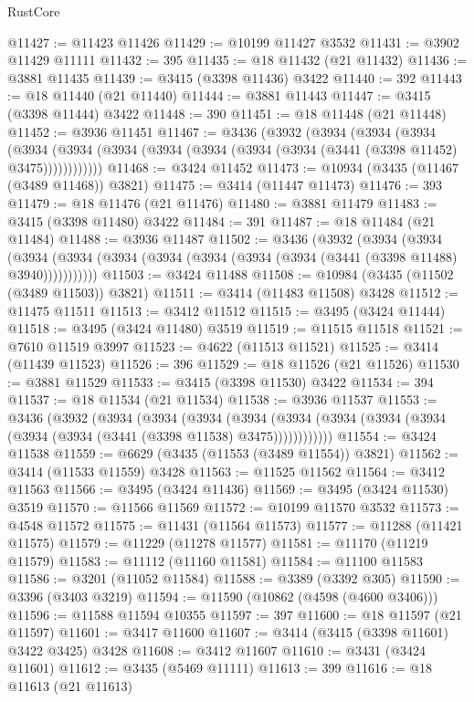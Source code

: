 \begin{lexlean}{RustCore}
\begin{coremodule}
@11427 := @11423 @11426
@11429 := @10199 @11427 @3532
@11431 := @3902 @11429 @11111
@11432 := 395
@11435 := @18 @11432 (@21 @11432)
@11436 := @3881 @11435
@11439 := @3415 (@3398 @11436) @3422
@11440 := 392
@11443 := @18 @11440 (@21 @11440)
@11444 := @3881 @11443
@11447 := @3415 (@3398 @11444) @3422
@11448 := 390
@11451 := @18 @11448 (@21 @11448)
@11452 := @3936 @11451
@11467 := @3436
    (@3932
      (@3934
        (@3934
          (@3934
            (@3934 (@3934 (@3934 (@3934 (@3934 (@3934 (@3934 (@3441 (@3398 @11452) @3475))))))))))))
@11468 := @3424 @11452
@11473 := @10934 (@3435 (@11467 (@3489 @11468)) @3821)
@11475 := @3414 (@11447 @11473)
@11476 := 393
@11479 := @18 @11476 (@21 @11476)
@11480 := @3881 @11479
@11483 := @3415 (@3398 @11480) @3422
@11484 := 391
@11487 := @18 @11484 (@21 @11484)
@11488 := @3936 @11487
@11502 := @3436
    (@3932
      (@3934
        (@3934
          (@3934 (@3934 (@3934 (@3934 (@3934 (@3934 (@3934 (@3441 (@3398 @11488) @3940)))))))))))
@11503 := @3424 @11488
@11508 := @10984 (@3435 (@11502 (@3489 @11503)) @3821)
@11511 := @3414 (@11483 @11508) @3428
@11512 := @11475 @11511
@11513 := @3412 @11512
@11515 := @3495 (@3424 @11444)
@11518 := @3495 (@3424 @11480) @3519
@11519 := @11515 @11518
@11521 := @7610 @11519 @3997
@11523 := @4622 (@11513 @11521)
@11525 := @3414 (@11439 @11523)
@11526 := 396
@11529 := @18 @11526 (@21 @11526)
@11530 := @3881 @11529
@11533 := @3415 (@3398 @11530) @3422
@11534 := 394
@11537 := @18 @11534 (@21 @11534)
@11538 := @3936 @11537
@11553 := @3436
    (@3932
      (@3934
        (@3934
          (@3934
            (@3934 (@3934 (@3934 (@3934 (@3934 (@3934 (@3934 (@3441 (@3398 @11538) @3475))))))))))))
@11554 := @3424 @11538
@11559 := @6629 (@3435 (@11553 (@3489 @11554)) @3821)
@11562 := @3414 (@11533 @11559) @3428
@11563 := @11525 @11562
@11564 := @3412 @11563
@11566 := @3495 (@3424 @11436)
@11569 := @3495 (@3424 @11530) @3519
@11570 := @11566 @11569
@11572 := @10199 @11570 @3532
@11573 := @4548 @11572
@11575 := @11431 (@11564 @11573)
@11577 := @11288 (@11421 @11575)
@11579 := @11229 (@11278 @11577)
@11581 := @11170 (@11219 @11579)
@11583 := @11112 (@11160 @11581)
@11584 := @11100 @11583
@11586 := @3201 (@11052 @11584)
@11588 := @3389 (@3392 @305)
@11590 := @3396 (@3403 @3219)
@11594 := @11590 (@10862 (@4598 (@4600 @3406)))
@11596 := @11588 @11594 @10355
@11597 := 397
@11600 := @18 @11597 (@21 @11597)
@11601 := @3417 @11600
@11607 := @3414 (@3415 (@3398 @11601) @3422 @3425) @3428
@11608 := @3412 @11607
@11610 := @3431 (@3424 @11601)
@11612 := @3435 (@5469 @11111)
@11613 := 399
@11616 := @18 @11613 (@21 @11613)

\end{coremodule}
\end{lexlean}
